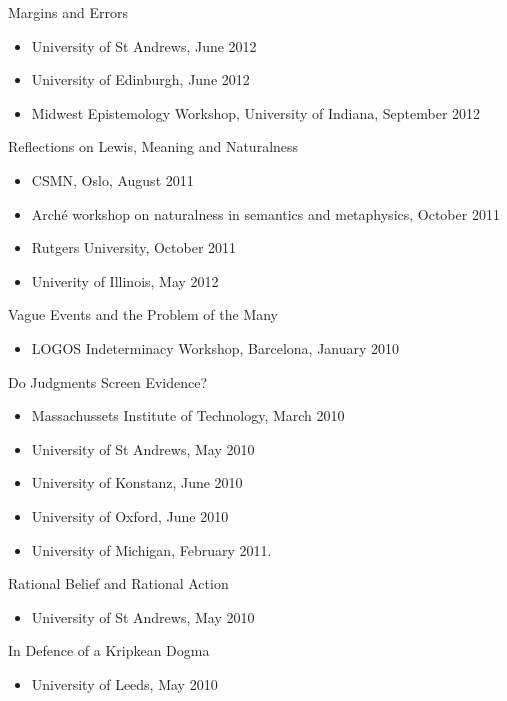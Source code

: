 \documentclass[
  10pt,
  letterpaper,
  DIV=11,
  numbers=noendperiod,
  twoside]{scrartcl}
\providecommand{\tightlist}{%
  \setlength{\itemsep}{0pt}\setlength{\parskip}{0pt}}
\begin{document}
Margins and Errors

\begin{itemize}
\tightlist
\item
  University of St Andrews, June 2012
\item
  University of Edinburgh, June 2012
\item
  Midwest Epistemology Workshop, University of Indiana, September 2012
\end{itemize}

Reflections on Lewis, Meaning and Naturalness

\begin{itemize}
\tightlist
\item
  CSMN, Oslo, August 2011
\item
  Arché workshop on naturalness in semantics and metaphysics, October
  2011
\item
  Rutgers University, October 2011
\item
  Univerity of Illinois, May 2012
\end{itemize}

Vague Events and the Problem of the Many

\begin{itemize}
\tightlist
\item
  LOGOS Indeterminacy Workshop, Barcelona, January 2010
\end{itemize}

Do Judgments Screen Evidence?

\begin{itemize}
\tightlist
\item
  Massachussets Institute of Technology, March 2010
\item
  University of St Andrews, May 2010
\item
  University of Konstanz, June 2010
\item
  University of Oxford, June 2010
\item
  University of Michigan, February 2011.
\end{itemize}

Rational Belief and Rational Action

\begin{itemize}
\tightlist
\item
  University of St Andrews, May 2010
\end{itemize}

In Defence of a Kripkean Dogma

\begin{itemize}
\tightlist
\item
  University of Leeds, May 2010
\end{itemize}
\end{document}
